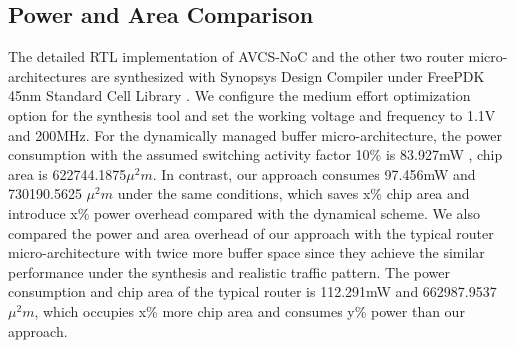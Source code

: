 \documentclass[10pt,conference]{IEEEtran}
\begin{document}
\subsection{Power and Area Comparison}
The detailed RTL implementation of AVCS-NoC and the other two router micro-architectures are synthesized with Synopsys Design Compiler under FreePDK 45nm Standard Cell Library \cite{nangate}. We configure the medium effort optimization option for the synthesis tool and set the working voltage and frequency to 1.1V and 200MHz. For the dynamically managed buffer micro-architecture, the power consumption with the assumed switching activity factor 10\% is 83.927mW , chip area is 622744.1875$\mu^2 m$. In contrast, our approach consumes 97.456mW and 730190.5625 $\mu^2 m$ under the same conditions, which saves x\% chip area and introduce x\% power overhead compared with the dynamical scheme. We also compared the power and area overhead of our approach with the typical router micro-architecture with twice more buffer space since they achieve the similar performance under the synthesis and realistic traffic pattern. The power consumption and chip area of the typical router is 112.291mW and 662987.9537$\mu^2m$, which occupies x\% more chip area and consumes y\% power than our approach.

\end{document}
